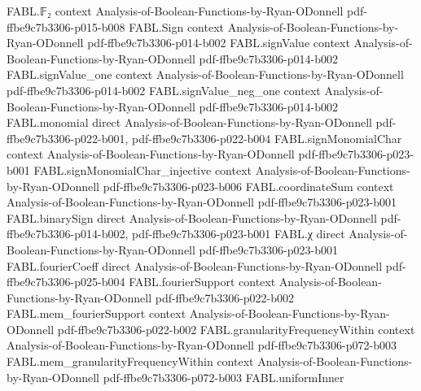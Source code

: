 \begin{theorem}
\label{FABL.DNFFormula.eval_truncateWidth_eq_neg_one_of}
\leanok
{}
\proofstep
  {FABL.𝔽₂}
  {context}
  {Analysis-of-Boolean-Functions-by-Ryan-ODonnell}
  {pdf-ffbe9c7b3306-p015-b008}
\proofstep
  {FABL.Sign}
  {context}
  {Analysis-of-Boolean-Functions-by-Ryan-ODonnell}
  {pdf-ffbe9c7b3306-p014-b002}
\proofstep
  {FABL.signValue}
  {context}
  {Analysis-of-Boolean-Functions-by-Ryan-ODonnell}
  {pdf-ffbe9c7b3306-p014-b002}
\proofstep
  {FABL.signValue_one}
  {context}
  {Analysis-of-Boolean-Functions-by-Ryan-ODonnell}
  {pdf-ffbe9c7b3306-p014-b002}
\proofstep
  {FABL.signValue_neg_one}
  {context}
  {Analysis-of-Boolean-Functions-by-Ryan-ODonnell}
  {pdf-ffbe9c7b3306-p014-b002}
\proofstep
  {FABL.monomial}
  {direct}
  {Analysis-of-Boolean-Functions-by-Ryan-ODonnell}
  {pdf-ffbe9c7b3306-p022-b001,
    pdf-ffbe9c7b3306-p022-b004}
\proofstep
  {FABL.signMonomialChar}
  {context}
  {Analysis-of-Boolean-Functions-by-Ryan-ODonnell}
  {pdf-ffbe9c7b3306-p023-b001}
\proofstep
  {FABL.signMonomialChar_injective}
  {context}
  {Analysis-of-Boolean-Functions-by-Ryan-ODonnell}
  {pdf-ffbe9c7b3306-p023-b006}
\proofstep
  {FABL.coordinateSum}
  {context}
  {Analysis-of-Boolean-Functions-by-Ryan-ODonnell}
  {pdf-ffbe9c7b3306-p023-b001}
\proofstep
  {FABL.binarySign}
  {direct}
  {Analysis-of-Boolean-Functions-by-Ryan-ODonnell}
  {pdf-ffbe9c7b3306-p014-b002,
    pdf-ffbe9c7b3306-p023-b001}
\proofstep
  {FABL.χ}
  {direct}
  {Analysis-of-Boolean-Functions-by-Ryan-ODonnell}
  {pdf-ffbe9c7b3306-p023-b001}
\proofstep
  {FABL.fourierCoeff}
  {direct}
  {Analysis-of-Boolean-Functions-by-Ryan-ODonnell}
  {pdf-ffbe9c7b3306-p025-b004}
\proofstep
  {FABL.fourierSupport}
  {context}
  {Analysis-of-Boolean-Functions-by-Ryan-ODonnell}
  {pdf-ffbe9c7b3306-p022-b002}
\proofstep
  {FABL.mem_fourierSupport}
  {context}
  {Analysis-of-Boolean-Functions-by-Ryan-ODonnell}
  {pdf-ffbe9c7b3306-p022-b002}
\proofstep
  {FABL.granularityFrequencyWithin}
  {context}
  {Analysis-of-Boolean-Functions-by-Ryan-ODonnell}
  {pdf-ffbe9c7b3306-p072-b003}
\proofstep
  {FABL.mem_granularityFrequencyWithin}
  {context}
  {Analysis-of-Boolean-Functions-by-Ryan-ODonnell}
  {pdf-ffbe9c7b3306-p072-b003}
\proofstep
  {FABL.uniformInner}

\end{theorem}
